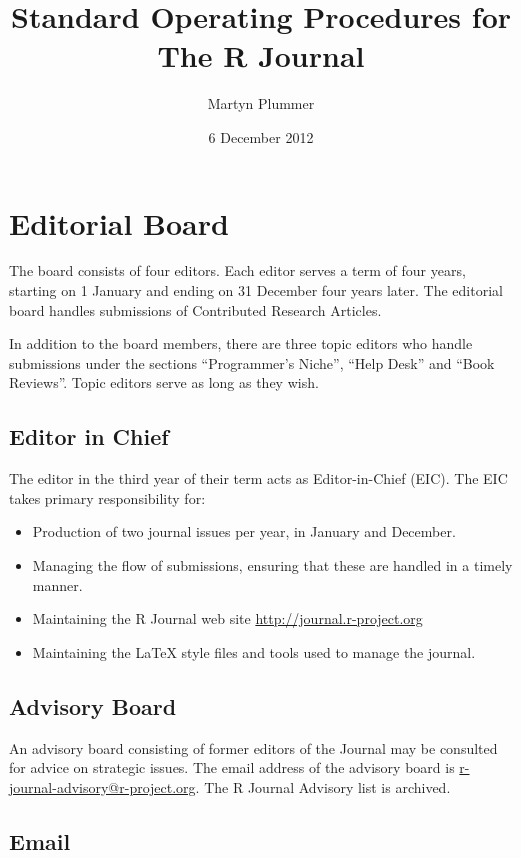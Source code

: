 \documentclass[11pt]{article}
\begin{document}
\title{Standard Operating Procedures for The R Journal}
\author{Martyn Plummer}
\date{6 December 2012}
\maketitle

\section{Editorial Board}

The board consists of four editors. Each editor serves a term of four
years, starting on 1 January and ending on 31 December four years
later. The editorial board handles submissions of Contributed Research
Articles.

In addition to the board members, there are three topic editors who
handle submissions under the sections ``Programmer's Niche'', ``Help
Desk'' and ``Book Reviews''. Topic editors serve as long as they wish.

\subsection{Editor in Chief}

The editor in the third year of their term acts as Editor-in-Chief
(EIC). The EIC takes primary responsibility for:
\begin{itemize}
\item Production of two journal issues per year, in January and December.
\item Managing the flow of submissions, ensuring that these are
  handled in a timely manner.
\item Maintaining the R Journal web site \url{http://journal.r-project.org}
\item Maintaining the LaTeX style files and tools used to manage the
  journal.
\end{itemize}

\subsection{Advisory Board}

An advisory board consisting of former editors of the Journal may be
consulted for advice on strategic issues.  The email address of the
advisory board is \url{r-journal-advisory@r-project.org}. The R
Journal Advisory list is archived.

\subsection{Email}
\end{document}
